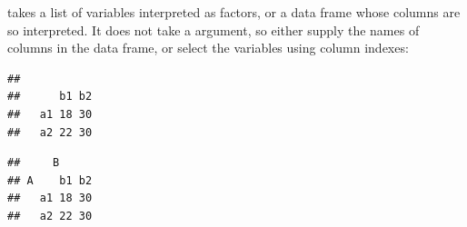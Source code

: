 \documentclass[11pt]{book}
\renewenvironment{knitrout}{\small\renewcommand{\baselinestretch}{.85}}{} %
\begin{document}
\begin{knitrout}
\color{fgcolor}\begin{kframe}
\begin{alltt}
\hlstd{(}\hlstd{)}   
\hlkwb{=}
 \hlkwb{<-} \hlstd{(}\hlstd{(}\hlstd{(}\hlstd{,} \hlstd{=}\hlstd{))}
 \hlkwb{<-} \hlstd{(}\hlstd{(}\hlstd{(}\hlstd{,} \hlstd{=}\hlstd{))}
 \hlkwb{<-} \hlstd{(}\hlstd{(}\hlstd{(}\hlstd{,}  \hlstd{=}\hlstd{))}
 \hlkwb{<-} \hlstd{(} \hlstd{=}\hlstd{,} \hlstd{=}\hlstd{))}
 \hlkwb{<-} 
\end{alltt}
\end{kframe}
\end{knitrout}

 takes a list of variables interpreted as factors,
or a data frame whose columns are so interpreted.
It does not take a  argument, so either supply the
names of columns in the data frame, or select the variables using column indexes:
\begin{knitrout}
\color{fgcolor}\begin{kframe}
\begin{alltt}
\hlopt{$}\hlopt{$}             
\end{alltt}
\begin{verbatim}
##     
##      b1 b2
##   a1 18 30
##   a2 22 30
\end{verbatim}
\begin{alltt}
 \hlkwb{<-} \hlstd{(mydata[,}\hlopt{:}\hlstd{]))}        
\end{alltt}
\begin{verbatim}
##     B
## A    b1 b2
##   a1 18 30
##   a2 22 30
\end{verbatim}
\end{kframe}
\end{knitrout}
\end{document}
